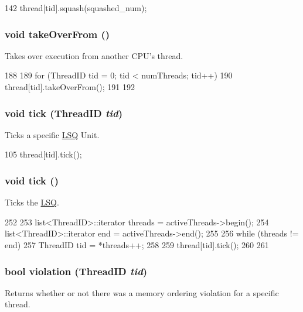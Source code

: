 \begin{DoxyCode}
142     { thread[tid].squash(squashed_num); }
\end{DoxyCode}
\hypertarget{classLSQ_a8674059ce345e23aac5086b2c3e24a43}{
\subsubsection[{takeOverFrom}]{\setlength{\rightskip}{0pt plus 5cm}void takeOverFrom ()}}
\label{classLSQ_a8674059ce345e23aac5086b2c3e24a43}
Takes over execution from another CPU's thread. 


\begin{DoxyCode}
188 {
189     for (ThreadID tid = 0; tid < numThreads; tid++) {
190         thread[tid].takeOverFrom();
191     }
192 }
\end{DoxyCode}
\hypertarget{classLSQ_a6968bcfead3fa275f8a1e740c1e337e8}{
\subsubsection[{tick}]{\setlength{\rightskip}{0pt plus 5cm}void tick ({\bf ThreadID} {\em tid})}}
\label{classLSQ_a6968bcfead3fa275f8a1e740c1e337e8}
Ticks a specific \hyperlink{classLSQ}{LSQ} Unit. 


\begin{DoxyCode}
105     { thread[tid].tick(); }
\end{DoxyCode}
\hypertarget{classLSQ_a873dd91783f9efb4a590aded1f70d6b0}{
\subsubsection[{tick}]{\setlength{\rightskip}{0pt plus 5cm}void tick ()}}
\label{classLSQ_a873dd91783f9efb4a590aded1f70d6b0}
Ticks the \hyperlink{classLSQ}{LSQ}. 


\begin{DoxyCode}
252 {
253     list<ThreadID>::iterator threads = activeThreads->begin();
254     list<ThreadID>::iterator end = activeThreads->end();
255 
256     while (threads != end) {
257         ThreadID tid = *threads++;
258 
259         thread[tid].tick();
260     }
261 }
\end{DoxyCode}
\hypertarget{classLSQ_a24dee29bada56cd1c98a7c3d80e77b6e}{
\subsubsection[{violation}]{\setlength{\rightskip}{0pt plus 5cm}bool violation ({\bf ThreadID} {\em tid})}}
\label{classLSQ_a24dee29bada56cd1c98a7c3d80e77b6e}
Returns whether or not there was a memory ordering violation for a specific thread. 


